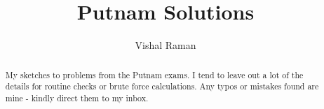 \documentclass[11pt]{scrartcl}
\newcommand{\<}{\langle}
\renewcommand{\>}{\rangle}
\begin{document}
\title{Putnam Solutions}
\author{Vishal Raman}
\maketitle
\begin{abstract}
My sketches to problems from the Putnam exams.   I tend to leave out a lot of the details for routine checks or brute force calculations.  Any typos or mistakes found are mine - kindly direct them to my inbox.
\end{abstract}
\tableofcontents
\pagebreak
\end{document}
